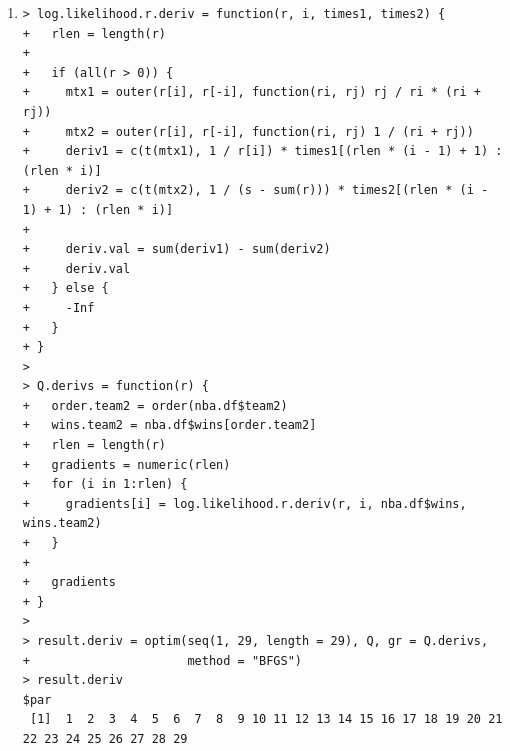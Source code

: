 \documentclass[11pt]{report}
\theoremstyle{definition}
\theoremstyle{remark}
\begin{document}
\begin{enumerate}
\begin{enumerate}
\begin{verbatim}
$convergence
[1] 0

$message
NULL

> 
> ratio = 100 / result$par[which.max(result$par)]
> r.value = result$par * ratio
> rr.value = c (r.value, (s - sum(result$par)) * ratio)
> rr.value
 [1]  22.620297  38.531300   6.638514  16.320396  20.775979  
35.204884  14.654177  20.714760  17.203279
[10] 100.000000  46.320893  21.441200  37.367766   9.941587  
25.149031  21.093608  21.970918  13.473837
[19]  15.524833  12.469774  30.404938  11.200987  10.538221   
8.870722  21.991566  14.065441  65.676566
[28]  34.250068  36.776521  30.966569
> 
> rank.table = data.frame(nba.names, rr.value, stringsAsFactors = FALSE)
> ordered.rank = rank.table[order(rank.table$rr.value, decreasing = TRUE),]
> colnames(ordered.rank) = c("name", "rank")
> rownames(ordered.rank) = 1:30
> ordered.rank
                     name       rank
1   Golden State Warriors 100.000000
2       San Antonio Spurs  65.676566
3         Houston Rockets  46.320893
4          Boston Celtics  38.531300
5    Los Angeles Clippers  37.367766
6               Utah Jazz  36.776521
7     Cleveland Cavaliers  35.204884
8         Toronto Raptors  34.250068
9      Washington Wizards  30.966569
10  Oklahoma City Thunder  30.404938
11      Memphis Grizzlies  25.149031
12          Atlanta Hawks  22.620297
13 Portland Trail Blazers  21.991566
14        Milwaukee Bucks  21.970918
15         Indiana Pacers  21.441200
16             Miami Heat  21.093608
17          Chicago Bulls  20.775979
18         Denver Nuggets  20.714760
19        Detroit Pistons  17.203279
20      Charlotte Hornets  16.320396
21   New Orleans Pelicans  15.524833
22       Dallas Mavericks  14.654177
23       Sacramento Kings  14.065441
24 Minnesota Timberwolves  13.473837
25        New York Knicks  12.469774
26          Orlando Magic  11.200987
27     Philadelphia 76ers  10.538221
28     Los Angeles Lakers   9.941587
29           Phoenix Suns   8.870722
30          Brooklyn Nets   6.638514
>  \end{verbatim}
 	    \item[(b)] \begin{verbatim}> log.likelihood.r.deriv = function(r, i, times1, times2) {
+   rlen = length(r)
+   
+   if (all(r > 0)) {
+     mtx1 = outer(r[i], r[-i], function(ri, rj) rj / ri * (ri + rj))
+     mtx2 = outer(r[i], r[-i], function(ri, rj) 1 / (ri + rj))
+     deriv1 = c(t(mtx1), 1 / r[i]) * times1[(rlen * (i - 1) + 1) : (rlen * i)]
+     deriv2 = c(t(mtx2), 1 / (s - sum(r))) * times2[(rlen * (i - 1) + 1) : (rlen * i)]
+     
+     deriv.val = sum(deriv1) - sum(deriv2)
+     deriv.val
+   } else {
+     -Inf
+   }
+ }
> 
> Q.derivs = function(r) {
+   order.team2 = order(nba.df$team2)
+   wins.team2 = nba.df$wins[order.team2]
+   rlen = length(r)
+   gradients = numeric(rlen)
+   for (i in 1:rlen) {
+     gradients[i] = log.likelihood.r.deriv(r, i, nba.df$wins, wins.team2)
+   }
+   
+   gradients
+ }
> 
> result.deriv = optim(seq(1, 29, length = 29), Q, gr = Q.derivs, 
+                      method = "BFGS")
> result.deriv
$par
 [1]  1  2  3  4  5  6  7  8  9 10 11 12 13 14 15 16 17 18 19 20 21 22 23 24 25 26 27 28 29


\end{verbatim}
\end{enumerate}
\end{enumerate}
\end{document}
